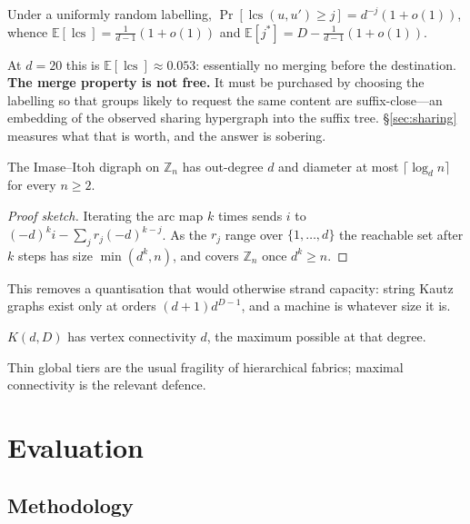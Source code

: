 \documentclass[sigconf,nonacm]{acmart}
\theoremstyle{acmdefinition}%
\newcommand{\Z}{\mathbb{Z}}
\newcommand{\E}{\mathbb{E}}
\newcommand{\lcs}{\operatorname{lcs}}
\begin{document}
\begin{proposition}
\label{prop:random}
Under a uniformly random labelling,
$\Pr[\lcs(u,u')\ge j]=d^{-j}(1+o(1))$, whence
$\E[\lcs]=\tfrac{1}{d-1}(1+o(1))$ and $\E[j^\ast]=D-\tfrac{1}{d-1}(1+o(1))$.
\end{proposition}

At $d=20$ this is $\E[\lcs]\approx0.053$: essentially no merging before the
destination. \textbf{The merge property is not free.} It must be purchased by
choosing the labelling so that groups likely to request the same content are
suffix-close---an embedding of the observed sharing hypergraph into the suffix
tree. \S\ref{sec:sharing} measures what that is worth, and the answer is
sobering.

\begin{theorem}
The Imase--Itoh digraph on $\Z_n$ has out-degree $d$ and diameter at most
$\lceil\log_d n\rceil$ for every $n\ge2$.
\end{theorem}

\begin{proof}[Proof sketch]
Iterating the arc map $k$ times sends $i$ to $(-d)^k i-\sum_j r_j(-d)^{k-j}$.
As the $r_j$ range over $\{1,\dots,d\}$ the reachable set after $k$ steps has
size $\min(d^k,n)$, and covers $\Z_n$ once $d^k\ge n$.
\end{proof}

This removes a quantisation that would otherwise strand capacity: string Kautz
graphs exist only at orders $(d+1)d^{D-1}$, and a machine is whatever size it
is.

\begin{proposition}
$K(d,D)$ has vertex connectivity $d$, the maximum possible at that degree.
\end{proposition}

Thin global tiers are the usual fragility of hierarchical fabrics; maximal
connectivity is the relevant defence.

\section{Evaluation}
\label{sec:eval}

\subsection{Methodology}
\end{document}
